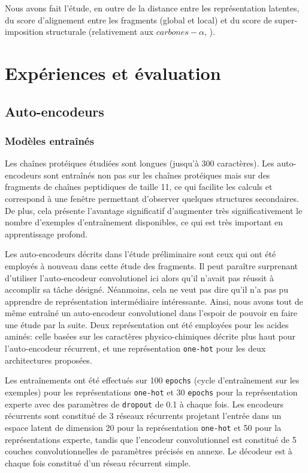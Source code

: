 \documentclass[a4paper, 11pt, onecolumn]{article}
\begin{document}
Nous avons fait l'étude, en outre de la distance entre les représentation
latentes, du score d'alignement entre les fragments (global et local) et du score de super-imposition structurale (relativement
aux $carbones-\alpha$, \cite{hamelryck2003pdb}).

\section{Expériences et évaluation}
\label{sec:exp}

\subsection{Auto-encodeurs}

\subsubsection{Modèles entraînés}

Les chaînes protéiques étudiées sont longues (jusqu'à 300 caractères). Les
auto-encodeurs sont entraînés non pas sur les chaînes protéiques mais sur des
fragments de chaînes peptidiques de taille 11, ce qui facilite les calculs et
correspond à une fenêtre permettant d'observer quelques structures secondaires.
De plus, cela présente l'avantage significatif d'augmenter très
significativement le nombre d'exemples d'entraînement disponibles, ce qui est
très important en apprentissage profond. 

Les auto-encodeurs décrits dans l'étude
préliminaire sont ceux qui ont été employés à nouveau dans cette étude des
fragments. Il peut paraître surprenant d'utiliser l'auto-encodeur convolutionel
ici alors qu'il n'avait pas réussit à accomplir sa tâche désigné. Néanmoins,
cela ne veut pas dire qu'il n'a pas pu apprendre de représentation intermédiaire
intéressante. Ainsi, nous avons tout de même entraîné un auto-encodeur
convolutionel dans l'espoir de pouvoir en faire une étude par la suite. Deux
représentation ont été employées pour les acides aminés: celle basées sur les
caractères physico-chimiques décrite plus haut pour l'auto-encodeur récurrent, et
une représentation \texttt{one-hot} pour les deux architectures proposées.

Les entraînements ont été effectués sur 100 \texttt{epochs} (cycle
d'entraînement sur les exemples) pour les représentations \texttt{one-hot} et 30
\texttt{epochs} pour la représentation experte avec des paramètres de \texttt{dropout} de 0.1
à chaque fois. Les encodeurs récurrents sont constitué de 3 réseaux récurrents
projetant l'entrée dans un espace latent de dimension 20 pour la représentation
\texttt{one-hot} et 50 pour la représentations experte,
tandis que l'encodeur convolutionnel est constitué de 5 couches convolutionnelles
de paramètres précisés en annexe. Le décodeur est à chaque fois constitué d'un
réseau récurrent simple.
\end{document}
